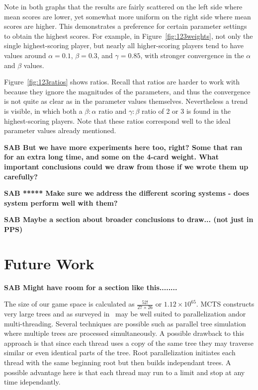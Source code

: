 \documentclass[letterpaper]{article}
\begin{document}
Note in both graphs that the results are fairly scattered on the left side where mean scores are lower, yet somewhat more uniform on the right side where mean scores are higher. This demonstrates a preference for certain parameter settings to obtain the highest scores. For example, in Figure~\ref{fig:123weights}, not only the single highest-scoring player, but nearly all higher-scoring players tend to have values around $\alpha = 0.1$, $\beta = 0.3$, and $\gamma = 0.85$, with stronger convergence in the $\alpha$ and $\beta$ values.

Figure~\ref{fig:123ratios} shows ratios. Recall that ratios are harder to work with because they ignore the magnitudes of the parameters, and thus the convergence is not quite as clear as in the parameter values themselves. Nevertheless a trend is visible, in which both a $\beta : \alpha$ ratio and $\gamma : \beta$ ratio of 2 or 3 is found in the highest-scoring players. Note that these ratios correspond well to the ideal parameter values already mentioned.

{\bf SAB But we have more experiments here too, right? Some that ran for an extra long time, and some on the 4-card weight. What important conclusions could we draw from those if we wrote them up carefully?}

{\bf SAB ***** Make sure we address the different scoring systems - does system perform well with them?}

{\bf SAB Maybe a section about broader conclusions to draw... (not just in PPS)}

\section{Future Work}

{\bf SAB Might have room for a section like this........}

The size of our game space is calculated as $\frac{52!}{27\times26}$ or $1.12 \times 10^{65}$. MCTS constructs very large trees and as surveyed in~\cite{browne2012survey} may be well suited to parallelization and\/or multi-threading. Several techniques are possible such as parallel tree simulation where multiple trees are processed simultaneously. A possible drawback to this approach is that since each thread uses a copy of the same tree they may traverse similar or even identical parts of the tree. Root parallelization initiates each thread with the same beginning root but then builds independant trees. A possible advantage here is that each thread may run to a limit and stop at any time idependantly.
\end{document}
